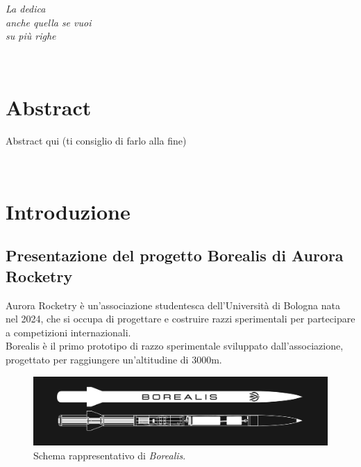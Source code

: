 \documentclass[12pt,a4paper,twoside]{book}
\begin{document}
\ifdefined\HCode
\else
    \topmargin=5.5cm
    \begin{flushright}
        \emph{
            \LARGE{La dedica}\\\vspace{3mm}
            \LARGE{anche quella se vuoi}\\\vspace{3mm}
            \LARGE{su più righe}
        }
    \end{flushright}
\fi
\newpage~\newpage
{}
\chapter*{Abstract}
Abstract qui (ti consiglio di farlo alla fine)

\topmargin=-1cm
\tableofcontents
\thispagestyle{empty}
\listoftables
\thispagestyle{empty}
\listoffigures
\thispagestyle{empty}
\newpage~\newpage


\setcounter{chapter}{0}
\raggedbottom
\chapter{Introduzione} \label{chap:intro}
\pagestyle{plain}
\setcounter{page}{1}

\section{Presentazione del progetto Borealis di Aurora Rocketry}
Aurora Rocketry è un'associazione studentesca dell'Università di Bologna nata
nel 2024, che si occupa di progettare e costruire razzi sperimentali per
partecipare a competizioni internazionali. \\
Borealis è il primo prototipo di razzo sperimentale sviluppato
dall'associazione, progettato per raggiungere un'altitudine di 3000m.

\begin{figure}[H]
    \centering
    \includegraphics[width=\textwidth]{img/borealis-schema.png}
    \caption{Schema rappresentativo di \emph{Borealis}.}
    \label{fig:borealis-schema}
\end{figure}
\end{document}
